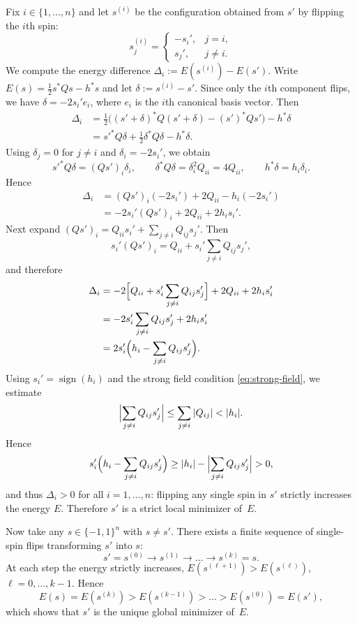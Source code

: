 \documentclass[journal]{IEEEtran}
\theoremstyle{myplain}
\begin{document}
\begin{IEEEproof}
Fix $i \in \{1,\dots,n\}$ and let $s^{(i)}$ be the configuration obtained
from $s'$ by flipping the $i$th spin:
\[
  s^{(i)}_j =
  \begin{cases}
    -s_i', & j = i,\\
    s_j',  & j \neq i.
  \end{cases}
\]
We compute the energy difference
$\Delta_i := E(s^{(i)}) - E(s')$.
Write $E(s) = \frac{1}{2} s^* Q s - h^* s$ and
let $\delta := s^{(i)} - s'$.
Since only the $i$th component flips, we have
$\delta = -2 s_i' e_i$, where $e_i$ is the $i$th canonical basis vector.
Then
\begin{align*}
  \Delta_i
  &= \frac{1}{2}\bigl((s'+\delta)^* Q (s'+\delta)
      - (s')^* Q s'\bigr) - h^* \delta \\
  &= s'^{*} Q \delta + \frac{1}{2} \delta^* Q \delta - h^* \delta.
\end{align*}
Using $\delta_j = 0$ for $j \neq i$ and $\delta_i = -2 s_i'$, we obtain
\[
  s'^{*} Q \delta = (Q s')_i \delta_i,
  \qquad
  \delta^* Q \delta = \delta_i^2 Q_{ii} = 4 Q_{ii},
  \qquad
  h^* \delta = h_i \delta_i.
\]
Hence
\begin{align*}
  \Delta_i
  &= (Q s')_i (-2 s_i') + 2 Q_{ii} - h_i (-2 s_i') \\
  &= -2 s_i' (Q s')_i + 2 Q_{ii} + 2 h_i s_i'.
\end{align*}
Next expand $(Q s')_i = Q_{ii} s_i' + \sum_{j \neq i} Q_{ij} s_j'$.
Then
\[
  s_i' (Q s')_i
  = Q_{ii} + s_i' \sum_{j \neq i} Q_{ij} s_j',
\]
and therefore
\begin{align*}
  \Delta_i
  &= -2\Bigl[Q_{ii} + s_i' \sum_{j \neq i} Q_{ij} s_j'\Bigr]
     + 2 Q_{ii} + 2 h_i s_i' \\
  &= -2 s_i' \sum_{j \neq i} Q_{ij} s_j' + 2 h_i s_i' \\
  &= 2 s_i' \Bigl(h_i - \sum_{j \neq i} Q_{ij} s_j'\Bigr).
\end{align*}
Using $s_i' = \operatorname{sign}(h_i)$ and the strong field condition
\eqref{eq:strong-field}, we estimate
\[
  \Bigl| \sum_{j \neq i} Q_{ij} s_j' \Bigr|
  \leq \sum_{j \neq i} |Q_{ij}|
  < |h_i|.
\]
Hence
\[
  s_i'\Bigl(h_i - \sum_{j \neq i} Q_{ij} s_j'\Bigr)
  \geq |h_i| - \Bigl|\sum_{j \neq i} Q_{ij} s_j'\Bigr|
  > 0,
\]
and thus $\Delta_i > 0$ for all $i=1,\dots,n$:
flipping any single spin in $s'$ strictly increases the energy $E$.
Therefore $s'$ is a strict local minimizer of~$E$.

Now take any $s \in \{-1,1\}^n$ with $s \neq s'$.
There exists a finite sequence of single-spin flips transforming $s'$
into $s$:
\[
  s' = s^{(0)} \to s^{(1)} \to \dots \to s^{(k)} = s.
\]
At each step the energy strictly increases,
$E(s^{(\ell+1)}) > E(s^{(\ell)})$, $\ell=0,\dots,k-1$.
Hence
\[
  E(s) = E(s^{(k)}) > E(s^{(k-1)}) > \dots > E(s^{(0)}) = E(s'),
\]
which shows that $s'$ is the unique global minimizer of~$E$.
\end{IEEEproof}
\end{document}
